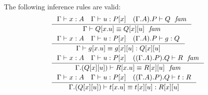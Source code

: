 \begin{lem}
The following inference rules are valid:
\begin{align*}
& \inference{\jterm{\Gamma}{A}{x}\quad\jterm{\Gamma}{\subst{x}{P}}{u}\quad\jfam{\ctxext{{\Gamma}{A}}{P}}{Q}}
  {\jfameq{\Gamma}{\subst{\ctxext{x}{u}}{Q}}{\subst{u}{{x}{Q}}}}\\
& \inference{\jterm{\Gamma}{A}{x}\quad\jterm{\Gamma}{\subst{x}{P}}{u}\quad\jterm{\ctxext{{\Gamma}{A}}{P}}{Q}{g}}
  {\jtermeq{\Gamma}{\subst{u}{{x}{Q}}}{\subst{\ctxext{x}{u}}{g}}{\subst{u}{{x}{g}}}}\\
& \inference{\jterm{\Gamma}{A}{x}\quad\jterm{\Gamma}{\subst{x}{P}}{u}\quad\jfam{\ctxext{{{\Gamma}{A}}{P}}{Q}}{R}}
  {\jfameq{\ctxext{\Gamma}{\subst{u}{{x}{Q}}}}{\subst{\ctxext{x}{u}}{R}}{\subst{u}{{x}{R}}}}\\
& \inference{\jterm{\Gamma}{A}{x}\quad\jterm{\Gamma}{\subst{x}{P}}{u}\quad\jterm{\ctxext{{{\Gamma}{A}}{P}}{Q}}{R}{t}}
  {\jtermeq{\ctxext{\Gamma}{\subst{u}{{x}{Q}}}}{\subst{u}{{x}{R}}}{\subst{\ctxext{x}{u}}{t}}{\subst{u}{{x}{t}}}}
\end{align*}
\end{lem}
